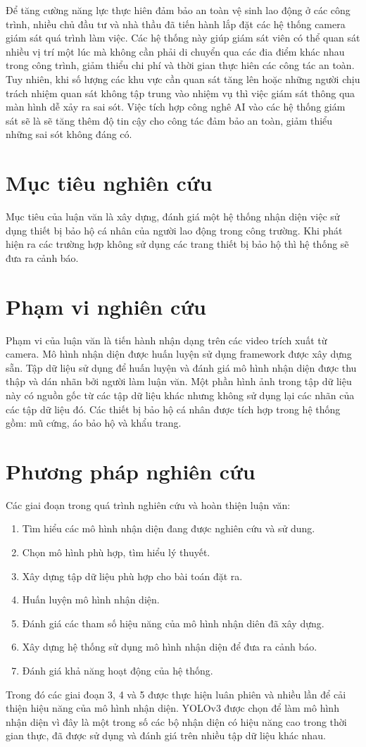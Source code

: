 Để tăng cường năng lực thực hiên đảm bảo an toàn vệ sinh lao động ở các công trình, nhiều chủ đầu tư và nhà thầu đã tiến hành lắp đặt các hệ thống camera giám sát quá trình làm việc. Các hệ thống này giúp giám sát viên có thể quan sát nhiều vị trí một lúc mà không cần phải di chuyển qua các đia điểm khác nhau trong công trình, giảm thiểu chi phí và thời gian thực hiên các công tác an toàn. Tuy nhiên, khi số lượng các khu vực cần quan sát tăng lên hoặc những người chịu trách nhiệm quan sát không tập trung vào nhiệm vụ  thì việc giám sát thông qua màn hình dễ xảy ra sai sót. Việc tích hợp công nghê AI vào các hệ thống giám sát sẽ là sẽ tăng thêm độ tin cậy cho công tác đảm bảo an toàn, giảm thiểu những sai sót không đáng có.

\section{Mục tiêu nghiên cứu}
Mục tiêu của luận văn là xây dựng, đánh giá một hệ thống nhận diện việc sử dụng thiết bị bảo hộ cá nhân của người lao động trong công trường. Khi phát hiện ra các trường hợp không sử dụng các trang thiết bị bảo hộ thì hệ thống sẽ đưa ra cảnh báo.  

\section{Phạm vi nghiên cứu}
Phạm vi của luận văn là tiến hành nhận dạng trên các video trích xuất từ camera. Mô hình nhận diện được huấn luyện sử dụng framework được xây dựng sẵn. Tập dữ liệu sử dụng để huấn luyện và đánh giá mô hình nhận diện được thu thập và dán nhãn bởi người làm luận văn. Một phần hình ảnh trong tập dữ liệu này có nguồn gốc từ các tập dữ liệu khác nhưng không sử dụng lại các nhãn của các tập dữ liệu đó. Các thiết bị bảo hộ cá nhân được tích hợp trong hệ thống gồm: mũ cứng, áo bảo hộ và khẩu trang.

\section{Phương pháp nghiên cứu}
Các giai đoạn trong quá trình nghiên cứu và hoàn thiện luận văn:
\begin{enumerate}
	\item Tìm hiểu các mô hình nhận diện đang được nghiên cứu và sử dung.
	\item Chọn mô hình phù hợp, tìm hiểu lý thuyết.
	\item Xây dựng tập dữ liệu phù hợp cho bài toán đặt ra.
	\item Huấn luyện mô hình nhận diện.
	\item Đánh giá các tham số hiệu năng của mô hình nhận diên đã xây dựng.
	\item Xây dựng hệ thống sử dụng mô hình nhận diện để đưa ra cảnh báo.
	\item Đánh giá khả năng hoạt động của hệ thống.
\end{enumerate}
Trong đó các giai đoạn 3, 4 và 5 được thực hiện luân phiên và nhiều lần để cải thiện hiệu năng của mô hình nhận diện. YOLOv3 được chọn để làm mô hình nhận diện vì đây là một trong số các bộ nhận diện có hiệu năng cao trong thời gian thực, đã được sử dụng và đánh giá trên nhiều tập dữ liệu khác nhau.


